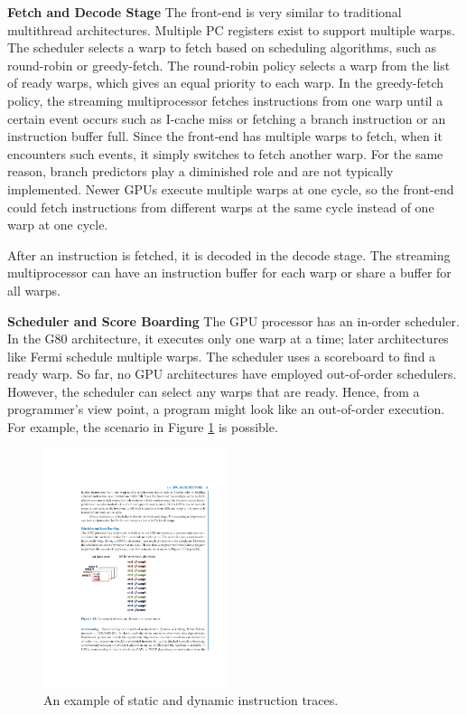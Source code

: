 \documentclass[twocolumn]{article}
\begin{document}
\noindent
\textbf{Fetch and Decode Stage}
The front-end is very similar to traditional multithread architectures. Multiple PC registers exist to support multiple warps. The scheduler selects a warp to fetch based on scheduling algorithms, such as round-robin or greedy-fetch. The round-robin policy selects a warp from the list of ready warps, which gives an equal priority to each warp. In the greedy-fetch policy, the streaming multiprocessor fetches instructions from one warp until a certain event occurs such as I-cache miss or fetching a branch instruction or an instruction buffer full. Since the front-end has multiple warps to fetch, when it encounters such events, it simply switches to fetch another warp. For the same reason, branch predictors play a diminished role and are not typically implemented. Newer GPUs execute multiple warps at one cycle, so the front-end could fetch instructions from different warps at the same cycle instead of one warp at one cycle.

After an instruction is fetched, it is decoded in the decode stage. The streaming multiprocessor can have an instruction buffer for each warp or share a buffer for all warps.

\noindent
\textbf{Scheduler and Score Boarding} 
The GPU processor has an in-order scheduler. In the G80 architecture, it executes only one warp at a time; later architectures like Fermi schedule multiple warps. The scheduler uses a scoreboard to find a ready warp. So far, no GPU architectures have employed out-of-order schedulers. However, the scheduler can select any warps that are ready. Hence, from a programmer’s view point, a program might look like an out-of-order execution. For example, the scenario in Figure \ref{fig:intruction-traces} is possible.
\begin{figure}[htb]
        \centering
        \includegraphics[width=0.48\textwidth]{instruction-traces.pdf}
        \caption{An example of static and dynamic instruction traces.}
        \label{fig:intruction-traces}
\end{figure}
\end{document}
